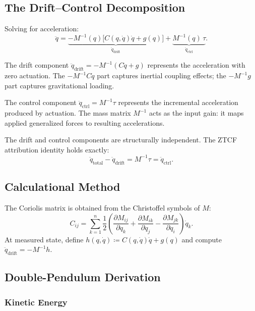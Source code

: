 \documentclass[11pt]{article}
\begin{document}
\subsection{The Drift--Control Decomposition}

Solving for acceleration:
\begin{equation}\label{eq:el-drift-control}
\ddot{q} = \underbrace{-M^{-1}(q)\bigl[C(q,\dot{q})\dot{q} + g(q)\bigr]}_{\ddot{q}_{\mathrm{drift}}} + \underbrace{M^{-1}(q)\,\tau}_{\ddot{q}_{\mathrm{ctrl}}}.
\end{equation}

The drift component $\ddot{q}_{\mathrm{drift}} = -M^{-1}(C\dot{q} + g)$ represents the acceleration with zero actuation.
The $-M^{-1}C\dot{q}$ part captures inertial coupling effects; the $-M^{-1}g$ part captures gravitational loading.

The control component $\ddot{q}_{\mathrm{ctrl}} = M^{-1}\tau$ represents the incremental acceleration produced by actuation.
The mass matrix $M^{-1}$ acts as the input gain: it maps applied generalized forces to resulting accelerations.

The drift and control components are structurally independent.
The ZTCF attribution identity holds exactly:
\begin{equation}
\ddot{q}_{\mathrm{total}} - \ddot{q}_{\mathrm{drift}} = M^{-1}\tau = \ddot{q}_{\mathrm{ctrl}}.
\end{equation}

\subsection{Calculational Method}

The Coriolis matrix is obtained from the Christoffel symbols of $M$:
\begin{equation}
C_{ij} = \sum_{k=1}^{n} \frac{1}{2}\left(\frac{\partial M_{ij}}{\partial q_k} + \frac{\partial M_{ik}}{\partial q_j} - \frac{\partial M_{jk}}{\partial q_i}\right)\dot{q}_k.
\end{equation}
At measured state, define $h(q,\dot{q}) \coloneqq C(q,\dot{q})\dot{q} + g(q)$ and compute $\ddot{q}_{\mathrm{drift}} = -M^{-1}h$.

\subsection{Double-Pendulum Derivation}

\subsubsection{Kinetic Energy}
\end{document}
